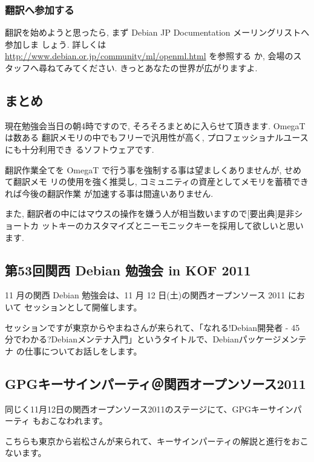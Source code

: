 \documentclass[mingoth,a4paper]{jsarticle}
\begin{document}
\subsubsection{翻訳へ参加する}
翻訳を始めようと思ったら, まず Debian JP Documentation メーリングリストへ参加しま
しょう. 詳しくは \url{http://www.debian.or.jp/community/ml/openml.html} を参照する
か, 会場のスタッフへ尋ねてみてください. きっとあなたの世界が広がりますよ.


\subsection{まとめ}
現在勉強会当日の朝4時ですので, そろそろまとめに入らせて頂きます. OmegaT は数ある
翻訳メモリの中でもフリーで汎用性が高く, プロフェッショナルユースにも十分利用でき
るソフトウェアです.

翻訳作業全てを OmegaT で行う事を強制する事は望ましくありませんが, せめて翻訳メモ
リの使用を強く推奨し, コミュニティの資産としてメモリを蓄積できれば今後の翻訳作業
が加速する事は間違いありません.

また, 翻訳者の中にはマウスの操作を嫌う人が相当数いますので[要出典]是非ショートカ
ットキーのカスタマイズとニーモニックキーを採用して欲しいと思います.

\clearpage

\subsection{第53回関西 Debian 勉強会 in KOF 2011 }

11 月の関西 Debian 勉強会は、11 月 12 日(土)の関西オープンソース 2011 において
セッションとして開催します。

セッションですが東京からやまねさんが来られて、「なれる!Debian開発者 - 45
分でわかる?Debianメンテナ入門」というタイトルで、Debianパッケージメンテナ
の仕事についてお話しをします。

\subsection{GPGキーサインパーティ＠関西オープンソース2011}

同じく11月12日の関西オープンソース2011のステージにて、GPGキーサインパーティ
もおこなわれます。

こちらも東京から岩松さんが来られて、キーサインパーティの解説と進行をおこ
ないます。
\end{document}
